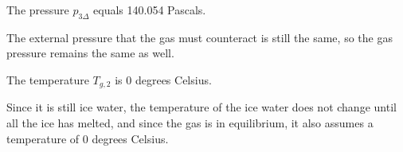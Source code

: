 The pressure \( p_{3\Delta} \) equals 140.054 Pascals.

The external pressure that the gas must counteract is still the same, so the gas pressure remains the same as well.

The temperature \( T_{g,2} \) is 0 degrees Celsius.

Since it is still ice water, the temperature of the ice water does not change until all the ice has melted, and since the gas is in equilibrium, it also assumes a temperature of 0 degrees Celsius.
